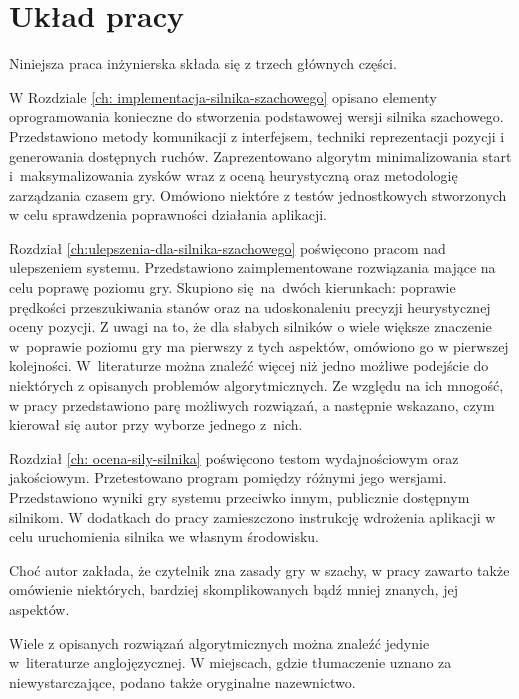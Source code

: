 \section{Układ pracy}
\label{sec:uklad-pracy}

Niniejsza praca inżynierska składa się z trzech głównych części.

W Rozdziale \ref{ch: implementacja-silnika-szachowego} opisano elementy oprogramowania konieczne do stworzenia podstawowej wersji silnika szachowego.
Przedstawiono metody komunikacji z interfejsem, techniki reprezentacji pozycji i generowania dostępnych ruchów.
Zaprezentowano algorytm minimalizowania start i~maksymalizowania zysków wraz z oceną heurystyczną oraz metodologię zarządzania czasem gry.
Omówiono niektóre z testów jednostkowych stworzonych w celu sprawdzenia poprawności działania aplikacji.

Rozdział \ref{ch:ulepszenia-dla-silnika-szachowego} poświęcono pracom nad ulepszeniem systemu.
Przedstawiono zaimplementowane rozwiązania mające na celu poprawę poziomu gry.
Skupiono się~na~dwóch kierunkach: poprawie prędkości przeszukiwania stanów oraz na udoskonaleniu precyzji heurystycznej oceny pozycji.
Z uwagi na to, że dla słabych silników o wiele większe znaczenie w~poprawie poziomu gry ma pierwszy z tych aspektów, omówiono go w pierwszej kolejności\cite*{Vrzina2023}.
W~literaturze można znaleźć więcej niż jedno możliwe podejście do niektórych z opisanych problemów algorytmicznych.
Ze względu na ich mnogość, w pracy przedstawiono parę możliwych rozwiązań, a następnie wskazano, czym kierował się autor przy wyborze jednego z~nich.

Rozdział \ref{ch: ocena-sily-silnika} poświęcono testom wydajnościowym oraz jakościowym.
Przetestowano program pomiędzy różnymi jego wersjami.
Przedstawiono wyniki gry systemu przeciwko innym, publicznie dostępnym silnikom.
W dodatkach do pracy zamieszczono instrukcję wdrożenia aplikacji w celu uruchomienia silnika we własnym środowisku.

Choć autor zakłada, że czytelnik zna zasady gry w szachy, w pracy zawarto także omówienie niektórych, bardziej skomplikowanych bądź mniej znanych, jej aspektów.

Wiele z opisanych rozwiązań algorytmicznych można znaleźć jedynie w~literaturze anglojęzycznej.
W miejscach, gdzie tłumaczenie uznano za niewystarczające, podano także oryginalne nazewnictwo.